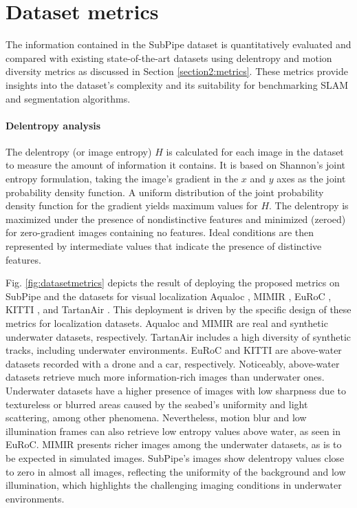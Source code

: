 \section{Dataset metrics}
\label{section:subpipe:metrics}
The information contained in the SubPipe dataset is quantitatively evaluated and compared with existing state-of-the-art datasets using delentropy and motion diversity metrics as discussed in Section \ref{section2:metrics}. These metrics provide insights into the dataset's complexity and its suitability for benchmarking SLAM and segmentation algorithms.

\paragraph*{Delentropy analysis} The delentropy (or image entropy) $H$ is calculated for each image in the dataset to measure the amount of information it contains. It is based on Shannon's joint entropy formulation, taking the image's gradient in the $x$ and $y$ axes as the joint probability density function. A uniform distribution of the joint probability density function for the gradient yields maximum values for $H$. The delentropy is maximized under the presence of nondistinctive features and minimized (zeroed) for zero-gradient images containing no features. Ideal conditions are then represented by intermediate values that indicate the presence of distinctive features.

Fig. \ref{fig:datasetmetrics} depicts the result of deploying the proposed metrics on SubPipe and the datasets for visual localization Aqualoc \cite{dataset:aqualocdb}, MIMIR \cite{dataset:mimir}, EuRoC \cite{dataset:burri2016euroc}, KITTI \cite{dataset:kitti}, and TartanAir \cite{dataset:tartanair2020iros}.  This deployment is driven by the specific design of these metrics for localization datasets. Aqualoc and MIMIR are real and synthetic underwater datasets, respectively. TartanAir includes a high diversity of synthetic tracks, including underwater environments. EuRoC and KITTI are above-water datasets recorded with a drone and a car, respectively.
Noticeably, above-water datasets retrieve much more information-rich images than underwater ones. Underwater datasets have a higher presence of images with low sharpness due to textureless or blurred areas caused by the seabed's uniformity and light scattering, among other phenomena. Nevertheless, motion blur and low illumination frames can also retrieve low entropy values above water, as seen in EuRoC. MIMIR presents richer images among the underwater datasets, as is to be expected in simulated images. SubPipe's images show delentropy values close to zero in almost all images, reflecting the uniformity of the background and low illumination, which highlights the challenging imaging conditions in underwater environments.

